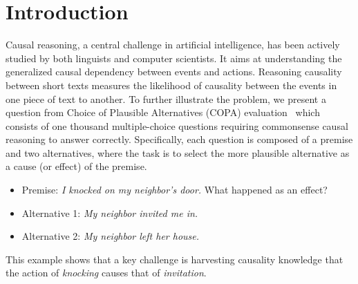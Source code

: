 \section{Introduction}
\label{sec:intro}


Causal reasoning, a central challenge in artificial intelligence,
has been actively studied by both linguists and computer scientists.
It aims at understanding the generalized causal dependency
between events and actions. %
Reasoning causality between short texts measures the likelihood of
causality between the events in one piece of text to another.
To further illustrate the problem, we present a question from
Choice of Plausible Alternatives (COPA)
evaluation~\cite{roemmele2011choice}
which consists of one thousand multiple-choice questions requiring
commonsense causal reasoning to answer correctly.
Specifically, each question is composed of a premise and two
alternatives, where the task is to select the more plausible
alternative as a cause (or effect) of the premise.

\begin{example}
\label{ex:copa}
\noindent
\begin{itemize}
\item[] Premise: \emph{I knocked on my neighbor's door.} What
happened as an effect?
\item[] Alternative 1: \emph{My neighbor invited me in.}
\item[] Alternative 2: \emph{My neighbor left her house.}
\end{itemize}
\end{example}

This example shows that a key challenge is
harvesting causality knowledge that the action of
{\em knocking} causes that of {\em invitation}.

